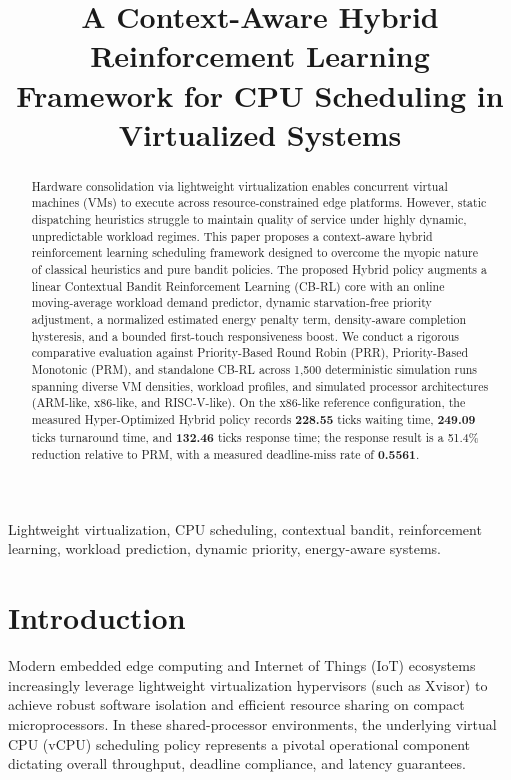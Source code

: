 \documentclass[conference]{IEEEtran}
\begin{document}
\title{A Context-Aware Hybrid Reinforcement Learning Framework for CPU Scheduling in Virtualized Systems}

\author{
}

\maketitle

\begin{abstract}
Hardware consolidation via lightweight virtualization enables concurrent virtual machines (VMs) to execute across resource-constrained edge platforms. However, static dispatching heuristics struggle to maintain quality of service under highly dynamic, unpredictable workload regimes. This paper proposes a context-aware hybrid reinforcement learning scheduling framework designed to overcome the myopic nature of classical heuristics and pure bandit policies. The proposed Hybrid policy augments a linear Contextual Bandit Reinforcement Learning (CB-RL) core with an online moving-average workload demand predictor, dynamic starvation-free priority adjustment, a normalized estimated energy penalty term, density-aware completion hysteresis, and a bounded first-touch responsiveness boost. We conduct a rigorous comparative evaluation against Priority-Based Round Robin (PRR), Priority-Based Monotonic (PRM), and standalone CB-RL across 1,500 deterministic simulation runs spanning diverse VM densities, workload profiles, and simulated processor architectures (ARM-like, x86-like, and RISC-V-like). On the x86-like reference configuration, the measured Hyper-Optimized Hybrid policy records \textbf{228.55} ticks waiting time, \textbf{249.09} ticks turnaround time, and \textbf{132.46} ticks response time; the response result is a 51.4\% reduction relative to PRM, with a measured deadline-miss rate of \textbf{0.5561}.
\end{abstract}

\begin{IEEEkeywords}
Lightweight virtualization, CPU scheduling, contextual bandit, reinforcement learning, workload prediction, dynamic priority, energy-aware systems.
\end{IEEEkeywords}

\section{Introduction}
Modern embedded edge computing and Internet of Things (IoT) ecosystems increasingly leverage lightweight virtualization hypervisors (such as Xvisor) to achieve robust software isolation and efficient resource sharing on compact microprocessors. In these shared-processor environments, the underlying virtual CPU (vCPU) scheduling policy represents a pivotal operational component dictating overall throughput, deadline compliance, and latency guarantees.
\end{document}
